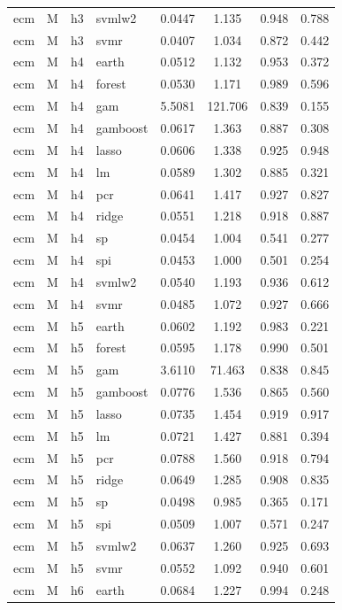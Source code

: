 \begin{ThreePartTable}
\begin{longtable}[t]{llclcccc}
ecm & M & h3 & svmlw2 & 0.0447 & 1.135 & 0.948 & 0.788\\
ecm & M & h3 & svmr & 0.0407 & 1.034 & 0.872 & 0.442\\
\addlinespace
ecm & M & h4 & earth & 0.0512 & 1.132 & 0.953 & 0.372\\
ecm & M & h4 & forest & 0.0530 & 1.171 & 0.989 & 0.596\\
ecm & M & h4 & gam & 5.5081 & 121.706 & 0.839 & 0.155\\
ecm & M & h4 & gamboost & 0.0617 & 1.363 & 0.887 & 0.308\\
ecm & M & h4 & lasso & 0.0606 & 1.338 & 0.925 & 0.948\\
ecm & M & h4 & lm & 0.0589 & 1.302 & 0.885 & 0.321\\
ecm & M & h4 & pcr & 0.0641 & 1.417 & 0.927 & 0.827\\
ecm & M & h4 & ridge & 0.0551 & 1.218 & 0.918 & 0.887\\
ecm & M & h4 & sp & 0.0454 & 1.004 & 0.541 & 0.277\\
ecm & M & h4 & spi & 0.0453 & 1.000 & 0.501 & 0.254\\
ecm & M & h4 & svmlw2 & 0.0540 & 1.193 & 0.936 & 0.612\\
ecm & M & h4 & svmr & 0.0485 & 1.072 & 0.927 & 0.666\\
\addlinespace
ecm & M & h5 & earth & 0.0602 & 1.192 & 0.983 & 0.221\\
ecm & M & h5 & forest & 0.0595 & 1.178 & 0.990 & 0.501\\
ecm & M & h5 & gam & 3.6110 & 71.463 & 0.838 & 0.845\\
ecm & M & h5 & gamboost & 0.0776 & 1.536 & 0.865 & 0.560\\
ecm & M & h5 & lasso & 0.0735 & 1.454 & 0.919 & 0.917\\
ecm & M & h5 & lm & 0.0721 & 1.427 & 0.881 & 0.394\\
ecm & M & h5 & pcr & 0.0788 & 1.560 & 0.918 & 0.794\\
ecm & M & h5 & ridge & 0.0649 & 1.285 & 0.908 & 0.835\\
ecm & M & h5 & sp & 0.0498 & 0.985 & 0.365 & 0.171\\
ecm & M & h5 & spi & 0.0509 & 1.007 & 0.571 & 0.247\\
ecm & M & h5 & svmlw2 & 0.0637 & 1.260 & 0.925 & 0.693\\
ecm & M & h5 & svmr & 0.0552 & 1.092 & 0.940 & 0.601\\
\addlinespace
ecm & M & h6 & earth & 0.0684 & 1.227 & 0.994 & 0.248\\

\end{longtable}
\end{ThreePartTable}
